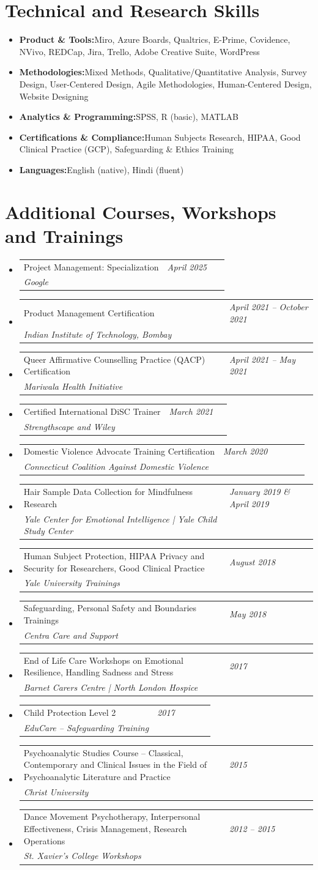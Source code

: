 \documentclass[a4paper,11pt]{article}
\newcommand{\resumeItem}[2]{
  \item{
    \textbf{#1}{\hspace{0.5mm}#2 \vspace{-0.5mm}}
  }
}
\newcommand{\resumeProject}[4]{
\vspace{0.5mm}\item
    \begin{tabularx}{0.98\textwidth}[t]{p{0.7\linewidth} >{\raggedleft\arraybackslash}p{0.3\linewidth}}
        {#1} & \textit{\footnotesize{#3}} \\
        \footnotesize{\textit{#2}} & \footnotesize{#4}
    \end{tabularx}
    \vspace{-2.4mm}
}
\newcommand{\resumeSubItem}[2]{\resumeItem{#1}{#2}\vspace{-4pt}}
\newcommand{\resumeSubHeadingListStart}{\begin{itemize}[leftmargin=*,labelsep=1mm]}
\newcommand{\resumeHeadingSkillStart}{\begin{itemize}[leftmargin=*,itemsep=1.7mm, rightmargin=2ex]}
\newcommand{\resumeSubHeadingListEnd}{\end{itemize}\vspace{2mm}}
\newcommand{\resumeHeadingSkillEnd}{\end{itemize}\vspace{-2mm}}
\begin{document}
\section{\textbf{Technical and Research Skills}}
\vspace{-0.4mm}
\resumeHeadingSkillStart
\resumeSubItem{Product \& Tools:}
{Miro, Azure Boards, Qualtrics, E-Prime, Covidence, NVivo, REDCap, Jira, Trello, Adobe Creative Suite, WordPress}
\resumeSubItem{Methodologies:}
{Mixed Methods, Qualitative/Quantitative Analysis, Survey Design, User-Centered Design, Agile Methodologies, Human-Centered Design, Website
  Designing}
\resumeSubItem{Analytics \& Programming:}
{SPSS, R (basic), MATLAB}
\resumeSubItem{Certifications \& Compliance:}
{Human Subjects Research, HIPAA, Good Clinical Practice (GCP), Safeguarding \& Ethics Training}
\resumeSubItem{Languages:}
{English (native), Hindi (fluent)}
\resumeHeadingSkillEnd


\section{\textbf{Additional Courses, Workshops and Trainings}}
\vspace{-0.2mm}
\resumeSubHeadingListStart
\resumeProject{Project Management: Specialization}{Google}{April 2025}{}
\resumeProject{Product Management Certification}{Indian Institute of Technology, Bombay}{April 2021 – October 2021}{}
\resumeProject{Queer Affirmative Counselling Practice (QACP) Certification}{Mariwala Health Initiative}{April 2021 – May 2021}{}
\resumeProject{Certified International DiSC Trainer}{Strengthscape and Wiley}{March 2021}{}
\resumeProject{Domestic Violence Advocate Training Certification}{Connecticut Coalition Against Domestic Violence}{March 2020}{}
\resumeProject{Hair Sample Data Collection for Mindfulness Research}{Yale Center for Emotional Intelligence | Yale Child Study Center}{January 2019 \& April 2019}{}
\resumeProject{Human Subject Protection, HIPAA Privacy and Security for Researchers, Good Clinical Practice}{Yale University Trainings}{August 2018}{}
\resumeProject{Safeguarding, Personal Safety and Boundaries Trainings}{Centra Care and Support}{May 2018}{}
\resumeProject{End of Life Care Workshops on Emotional Resilience, Handling Sadness and Stress}{Barnet Carers Centre | North London Hospice}{2017}{}
\resumeProject{Child Protection Level 2}{EduCare – Safeguarding Training}{2017}{}
\resumeProject{Psychoanalytic Studies Course – Classical, Contemporary and Clinical Issues in the Field of Psychoanalytic Literature and Practice}{Christ University}{2015}{}
\resumeProject{Dance Movement Psychotherapy, Interpersonal Effectiveness, Crisis Management, Research Operations}{St. Xavier’s College Workshops}{2012 – 2015}{}
\resumeSubHeadingListEnd
\vspace{-4mm}
\end{document}
